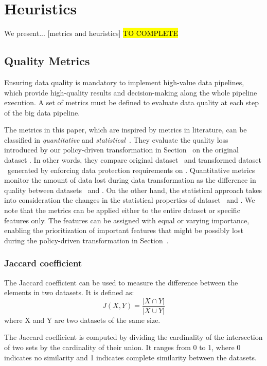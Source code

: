 \section{Heuristics}\label{sec:coalition}
We present... [metrics and heuristics] \hl{TO COMPLETE}


\subsection{Quality Metrics}\label{sec:metrics}


Ensuring data quality is mandatory to implement high-value data pipelines, which provide high-quality results and decision-making along the whole pipeline execution. A set of metrics must be defined to evaluate data quality at each step of the big data pipeline.

The metrics in this paper, which are inspired by metrics in literature, can be classified in \emph{quantitative} and \emph{statistical}~\cite{ADD}. They evaluate the quality loss introduced by our policy-driven transformation in Section~\cite{ADD} on the original dataset \origdataset. In other words, they compare original dataset \origdataset\ and transformed dataset \transdataset\ generated by enforcing data protection requirements on \origdataset. Quantitative metrics monitor the amount of data lost during data transformation as the difference in quality between datasets \origdataset\ and \transdataset.
On the other hand, the statistical approach takes into consideration the changes in the statistical properties of dataset \origdataset\ and \transdataset.
We note that the metrics can be applied either to the entire dataset or specific features only.
The features can be assigned with equal or varying importance, enabling the prioritization of important features that might be possibly lost during the policy-driven transformation in Section~\cite{ADD}.

\subsubsection{Jaccard coefficient}
The Jaccard coefficient can be used to measure the difference between the elements in two datasets.
It is defined as:\[J(X,Y) = \frac{|X \cap Y|}{|X \cup Y|}\]
where X and Y are two datasets of the same size.

The Jaccard coefficient is computed by dividing the cardinality of the intersection of two sets by the cardinality of their union. It ranges from 0 to 1, where 0 indicates no similarity and 1 indicates complete similarity between the datasets.


